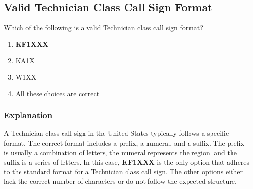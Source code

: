 \subsection{Valid Technician Class Call Sign Format}
\label{T1C05}

\begin{tcolorbox}[colback=gray!10!white,colframe=black!75!black,title=T1C05]
Which of the following is a valid Technician class call sign format?
\begin{enumerate}[label=\Alph*),noitemsep]
    \item \textbf{KF1XXX}
    \item KA1X
    \item W1XX
    \item All these choices are correct
\end{enumerate}
\end{tcolorbox}

\subsubsection*{Explanation}
A Technician class call sign in the United States typically follows a specific format. The correct format includes a prefix, a numeral, and a suffix. The prefix is usually a combination of letters, the numeral represents the region, and the suffix is a series of letters. In this case, \textbf{KF1XXX} is the only option that adheres to the standard format for a Technician class call sign. The other options either lack the correct number of characters or do not follow the expected structure.